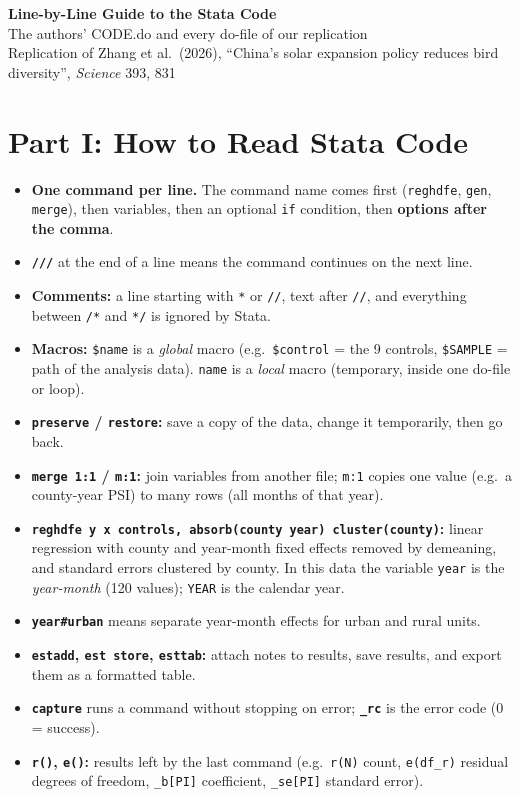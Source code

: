 \documentclass[10pt]{article}
\begin{document}
\begin{center}
{\LARGE\bfseries Line-by-Line Guide to the Stata Code}\\[4pt]
{\large The authors' CODE.do and every do-file of our replication}\\[3pt]
{\small Replication of Zhang et al.\ (2026), ``China's solar expansion policy reduces bird diversity'', \textit{Science} 393, 831}
\end{center}
\tableofcontents
\newpage

\section{Part I: How to Read Stata Code}
\begin{itemize}[leftmargin=14pt,itemsep=1pt]
\item \textbf{One command per line.} The command name comes first (\texttt{reghdfe}, \texttt{gen}, \texttt{merge}), then variables, then an optional \texttt{if} condition, then \textbf{options after the comma}.
\item \textbf{\texttt{///}} at the end of a line means the command continues on the next line.
\item \textbf{Comments:} a line starting with \texttt{*} or \texttt{//}, text after \texttt{//}, and everything between \texttt{/*} and \texttt{*/} is ignored by Stata.
\item \textbf{Macros:} \texttt{\$name} is a \emph{global} macro (e.g.\ \texttt{\$control} = the 9 controls, \texttt{\$SAMPLE} = path of the analysis data). \texttt{\textasciigrave name\textquotesingle} is a \emph{local} macro (temporary, inside one do-file or loop).
\item \textbf{\texttt{preserve} / \texttt{restore}:} save a copy of the data, change it temporarily, then go back.
\item \textbf{\texttt{merge 1:1} / \texttt{m:1}:} join variables from another file; \texttt{m:1} copies one value (e.g.\ a county-year PSI) to many rows (all months of that year).
\item \textbf{\texttt{reghdfe y x controls, absorb(county year) cluster(county)}:} linear regression with county and year-month fixed effects removed by demeaning, and standard errors clustered by county. In this data the variable \texttt{year} is the \emph{year-month} (120 values); \texttt{YEAR} is the calendar year.
\item \textbf{\texttt{year\#urban}} means separate year-month effects for urban and rural units.
\item \textbf{\texttt{estadd}, \texttt{est store}, \texttt{esttab}:} attach notes to results, save results, and export them as a formatted table.
\item \textbf{\texttt{capture}} runs a command without stopping on error; \textbf{\texttt{\_rc}} is the error code (0 = success).
\item \textbf{\texttt{r()}, \texttt{e()}:} results left by the last command (e.g.\ \texttt{r(N)} count, \texttt{e(df\_r)} residual degrees of freedom, \texttt{\_b[PI]} coefficient, \texttt{\_se[PI]} standard error).
\end{itemize}
\end{document}
